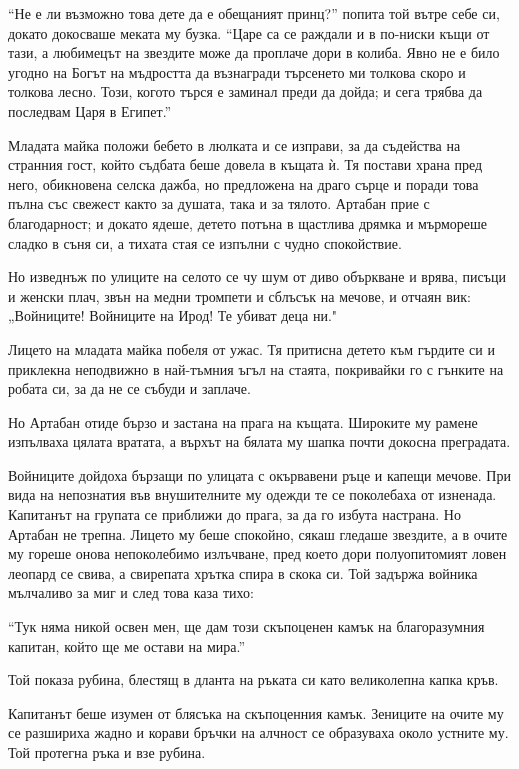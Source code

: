 \documentclass[oneside,10pt]{memoir}
\begin{document}
``Не е ли възможно това дете да е обещаният принц?'' попита той вътре себе си,
докато докосваше меката му бузка. ``Царе са се раждали и в по-ниски къщи от
тази, а любимецът на звездите може да проплаче дори в колиба. Явно не е било
угодно на Богът на мъдростта да възнагради търсенето ми толкова скоро и толкова
лесно. Този, когото търся е заминал преди да дойда; и сега трябва да последвам
Царя в Египет.''

Младата майка положи бебето в люлката и се изправи, за да съдейства на странния
гост, който съдбата беше довела в къщата ѝ. Тя постави храна пред него,
обикновена селска дажба, но предложена на драго сърце и поради това пълна със
свежест както за душата, така и за тялото. Артабан прие с благодарност; и докато
ядеше, детето потъна в щастлива дрямка и мърмореше сладко в съня си, а тихата
стая се изпълни с чудно спокойствие.

Но изведнъж по улиците на селото се чу шум от диво объркване и врява, писъци и
женски плач, звън на медни тромпети и сблъсък на мечове, и отчаян вик:
„Войниците! Войниците на Ирод! Те убиват деца ни."

Лицето на младата майка побеля от ужас. Тя притисна детето към гърдите си и
приклекна неподвижно в най-тъмния ъгъл на стаята, покривайки го с гънките на
робата си, за да не се събуди и заплаче.

Но Артабан отиде бързо и застана на прага на къщата. Широките му рамене
изпълваха цялата вратата, а върхът на бялата му шапка почти докосна преградата.

Войниците дойдоха бързащи по улицата с окървавени ръце и капещи мечове. При вида
на непознатия във внушителните му одежди те се поколебаха от изненада. Капитанът
на групата се приближи до прага, за да го избута настрана. Но Артабан не трепна.
Лицето му беше спокойно, сякаш гледаше звездите, а в очите му гореше онова
непоколебимо излъчване, пред което дори полуопитомият ловен леопард се свива, а
свирепата хрътка спира в скока си. Той задържа войника мълчаливо за миг и след
това каза тихо:

``Тук няма никой освен мен, ще дам този скъпоценен камък на благоразумния
капитан, който ще ме остави на мира.''

Той показа рубина, блестящ в дланта на ръката си като великолепна капка кръв.

Капитанът беше изумен от блясъка на скъпоценния камък. Зениците на очите му се
разшириха жадно и корави бръчки на алчност се образуваха около устните му. Той
протегна ръка и взе рубина.
\end{document}
